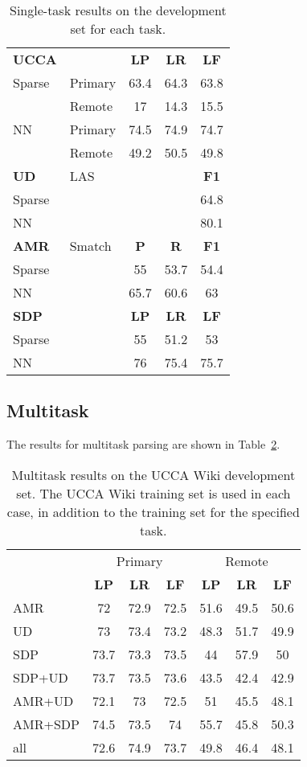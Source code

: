 \documentclass[11pt,a4paper]{article}
\begin{document}
\begin{table}
\begin{tabular}{llccc}
\textbf{UCCA} & & \textbf{LP} & \textbf{LR} & \textbf{LF} \\
Sparse & \small Primary & 63.4 & 64.3 & 63.8 \\
       & \small Remote & 17 & 14.3 & 15.5 \\
NN & \small Primary & 74.5 & 74.9 & 74.7 \\
       & \small Remote & 49.2 & 50.5 & 49.8 \\
\hline
\textbf{UD} & \small LAS & & & \textbf{F1} \\
Sparse & & & & 64.8 \\
NN & & & & 80.1 \\
\hline
\textbf{AMR} & \small Smatch & \textbf{P} & \textbf{R} & \textbf{F1} \\
Sparse & & 55 & 53.7 & 54.4 \\
NN & & 65.7 & 60.6 & 63 \\
\hline
\textbf{SDP} & & \textbf{LP} & \textbf{LR} & \textbf{LF} \\
Sparse & & 55 & 51.2 & 53 \\
NN & & 76 & 75.4 & 75.7
\end{tabular}
\caption{Single-task results on the development set for each task.\label{tab:single}}
\end{table}


\subsection{Multitask}\label{sec:results_multi}

The results for multitask parsing are shown in Table~\ref{tab:multi}.

\begin{table}
\begin{tabular}{lccc|ccc}
& \multicolumn{3}{c|}{Primary} & \multicolumn{3}{c}{Remote} \\
& \textbf{LP} & \textbf{LR} & \textbf{LF} & \textbf{LP} & \textbf{LR} & \textbf{LF} \\
\small AMR & 72 & 72.9 & 72.5 & 51.6 & 49.5 & 50.6 \\
\small UD & 73 & 73.4 & 73.2 & 48.3 & 51.7 & 49.9 \\
\small SDP & 73.7 & 73.3 & 73.5 & 44 & 57.9 & 50 \\
\small SDP+UD & 73.7 & 73.5 & 73.6 & 43.5 & 42.4 & 42.9 \\
\small AMR+UD & 72.1 & 73 & 72.5 & 51 & 45.5 & 48.1 \\
\small AMR+SDP & 74.5 & 73.5 & 74 & 55.7 & 45.8 & 50.3 \\
\small all & 72.6 & 74.9 & 73.7 & 49.8 & 46.4 & 48.1
\end{tabular}
\caption{Multitask results on the UCCA Wiki development set.
The UCCA Wiki training set is used in each case, in addition to the training
set for the specified task.\label{tab:multi}}
\end{table}
\end{document}
